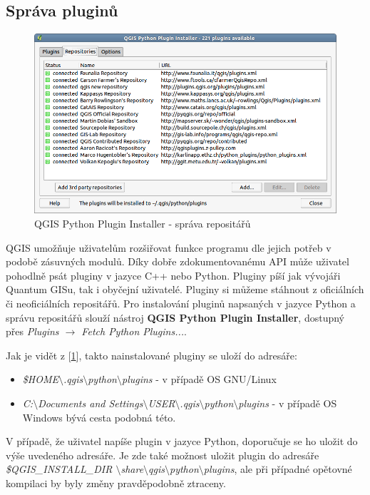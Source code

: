 \subsection{Správa pluginů}
\begin{figure}[h]
	\centering
	\includegraphics[scale=0.5]{pictures/qgis_plugin/python_installer}
	\caption{QGIS Python Plugin Installer - správa repositářů}
  	\label{pythonplugininstaller}
\end{figure}

QGIS umožňuje uživatelům rozšiřovat funkce programu dle jejich potřeb v podobě zásuvných modulů. Díky dobře zdokumentovanému API může uživatel pohodlně psát pluginy v jazyce C++ nebo Python. Pluginy píší jak vývojáři Quantum GISu, tak i obyčejní uživatelé. Pluginy si můžeme stáhnout z oficiálních či neoficiálních repositářů. Pro instalování pluginů napsaných v jazyce Python a správu repositářů slouží nástroj \textbf{QGIS Python Plugin Installer}, dostupný přes \textit{Plugins $\rightarrow$ Fetch Python Plugins...}.

\noindent Jak je vidět z [\figurename \ref{pythonplugininstaller}], takto nainstalované pluginy se uloží do adresáře: 

\begin{itemize}
	\item \textit{\$HOME$\setminus$.qgis$\setminus$python$\setminus$plugins} - v případě OS GNU/Linux
	\item \textit{C:$\setminus$Documents and Settings$\setminus$USER$\setminus$.qgis$\setminus$python$\setminus$plugins} - v případě OS Windows bývá cesta podobná této.
\end{itemize}

V případě, že uživatel napíše plugin v jazyce Python, doporučuje se ho uložit do výše uvedeného adresáře. Je zde také možnost uložit plugin do adresáře \textit{\$QGIS\_INSTALL\_DIR $\setminus$share$\setminus$qgis$\setminus$python$\setminus$plugins}, ale při případné opětovné kompilaci by byly změny pravděpodobně ztraceny.

